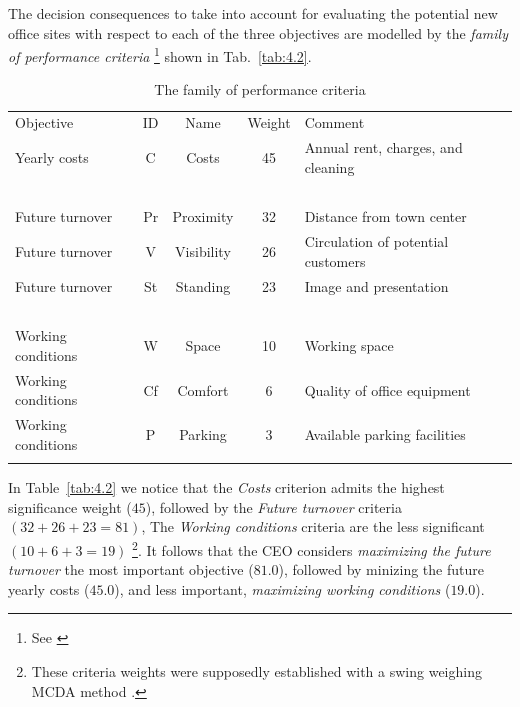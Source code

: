 The decision consequences to take into account for evaluating the potential new office sites with respect to each of the three objectives are modelled by the \emph{family of performance criteria} \footnote{See \citealp{ROY-2000}} shown in Tab.~\vref{tab:4.2}.
\begin{table}[ht]
\caption{The family of performance criteria}
\label{tab:4.2}       %
\begin{center}
    \begin{tabular}{l|c|c|c|l}
      \svhline\noalign{\smallskip}
      Objective & ID & Name & Weight & Comment\\
      \noalign{\smallskip}\hline\noalign{\smallskip}
    Yearly costs  &       C &   Costs &  45 &     Annual rent, charges, and cleaning\\
    \             &  \      & \        &  \ & \ \\
    Future turnover   &   Pr  & Proximity  & 32 & Distance from town center\\
    Future turnover   &   V  &  Visibility & 26 & Circulation of potential customers \\
    Future turnover   &   St &   Standing & 23 &   Image and presentation\\
    \                 &   \   & \          &  \ & \  \\
    Working conditions &  W  &  Space   &   10 &  Working space\\
    Working conditions &  Cf &  Comfort  &  6 &  Quality of office equipment\\
    Working conditions &  P  &  Parking  &  3 &  Available parking facilities\\
      \noalign{\smallskip}\hline
    \end{tabular}   
  \end{center}
\end{table}

In Table~\vref{tab:4.2} we notice that the \emph{Costs} criterion admits the highest significance weight ($45$), followed by the \emph{Future turnover} criteria $(32 + 26 + 23 = 81)$, The \emph{Working conditions} criteria are the less significant $(10 + 6 + 3 = 19)$ \footnote{These criteria weights were supposedly established with a swing weighing MCDA method \citep{KEE-1976}.}. It follows that the CEO considers \emph{maximizing the future turnover} the most important objective ($81.0$), followed by minizing the future yearly costs ($45.0$), and less important, \emph{maximizing working conditions} ($19.0$). 

